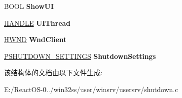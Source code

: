 \begin{DoxyCompactItemize}
B\+O\+OL {\bfseries Show\+UI}
\item 
\mbox{\label{structtag_n_o_t_i_f_y___c_o_n_t_e_x_t_a1fc39fe088ea5657a49de617c7a7fd7e}} 
\hyperlink{interfacevoid}{H\+A\+N\+D\+LE} {\bfseries U\+I\+Thread}
\item 
\mbox{\label{structtag_n_o_t_i_f_y___c_o_n_t_e_x_t_a57926545102acd4f3395925e835b0b37}} 
\hyperlink{interfacevoid}{H\+W\+ND} {\bfseries Wnd\+Client}
\item 
\mbox{\label{structtag_n_o_t_i_f_y___c_o_n_t_e_x_t_a77f0d2d83dcc4bae2814104fe7432d36}} 
\hyperlink{structtag_s_h_u_t_d_o_w_n___s_e_t_t_i_n_g_s}{P\+S\+H\+U\+T\+D\+O\+W\+N\+\_\+\+S\+E\+T\+T\+I\+N\+GS} {\bfseries Shutdown\+Settings}
\end{DoxyCompactItemize}


该结构体的文档由以下文件生成\+:\begin{DoxyCompactItemize}
\item 
E\+:/\+React\+O\+S-\/0../win32ss/user/winsrv/usersrv/shutdown.\+c\end{DoxyCompactItemize}
